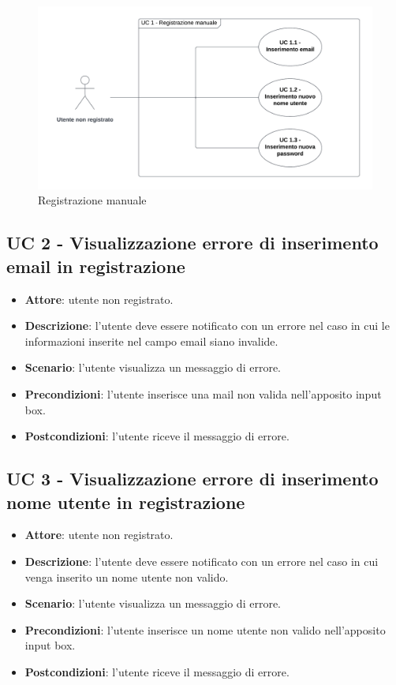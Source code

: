 \begin{figure}[!h]
    \includegraphics[width=15cm]{sezioni/Images/UC1_s.png}
    \centering
    \caption{Registrazione manuale}
\end{figure}

\subsection{UC 2 - Visualizzazione errore di inserimento email in registrazione}
\begin{itemize}
    \item \textbf{Attore}: utente non registrato.
    \item \textbf{Descrizione}: l'utente deve essere notificato con un errore nel caso in cui le informazioni inserite nel campo email siano invalide.
    \item \textbf{Scenario}: l'utente visualizza un messaggio di errore.
    \item \textbf{Precondizioni}: l'utente inserisce una mail non valida nell'apposito input box.
    \item \textbf{Postcondizioni}: l'utente riceve il messaggio di errore.
\end{itemize}

\subsection{UC 3 - Visualizzazione errore di inserimento nome utente in registrazione}
\begin{itemize}
    \item \textbf{Attore}: utente non registrato.
    \item \textbf{Descrizione}: l'utente deve essere notificato con un errore nel caso in cui venga inserito un nome utente non valido.
    \item \textbf{Scenario}: l'utente visualizza un messaggio di errore.
    \item \textbf{Precondizioni}: l'utente inserisce un nome utente non valido nell'apposito input box.
    \item \textbf{Postcondizioni}: l'utente riceve il messaggio di errore.
\end{itemize}

